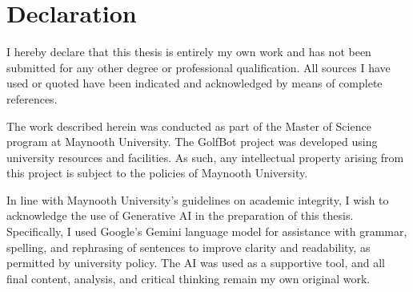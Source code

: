 \chapter*{Declaration}
\label{chap:declaration}

I hereby declare that this thesis is entirely my own work and has not been submitted for any other degree or professional qualification. All sources I have used or quoted have been indicated and acknowledged by means of complete references.

The work described herein was conducted as part of the Master of Science program at Maynooth University. The GolfBot project was developed using university resources and facilities. As such, any intellectual property arising from this project is subject to the policies of Maynooth University.

In line with Maynooth University's guidelines on academic integrity, I wish to acknowledge the use of Generative AI in the preparation of this thesis. Specifically, I used Google's Gemini language model for assistance with grammar, spelling, and rephrasing of sentences to improve clarity and readability, as permitted by university policy. The AI was used as a supportive tool, and all final content, analysis, and critical thinking remain my own original work.